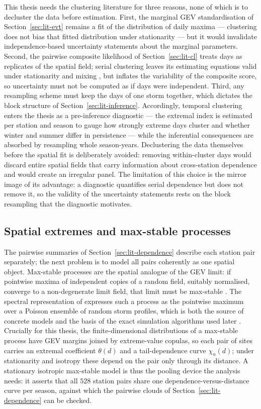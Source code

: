 This thesis needs the clustering literature for three reasons, none of which is to decluster the data before estimation. First, the marginal GEV standardisation of Section~\ref{sec:lit-evt} remains a fit of the distribution of daily maxima --- clustering does not bias that fitted distribution under stationarity --- but it would invalidate independence-based uncertainty statements about the marginal parameters. Second, the pairwise composite likelihood of Section~\ref{sec:lit-cl} treats days as replicates of the spatial field; serial clustering leaves its estimating equations valid under stationarity and mixing \citep{huserdavison2014}, but inflates the variability of the composite score, so uncertainty must not be computed as if days were independent. Third, any resampling scheme must keep the days of one storm together, which dictates the block structure of Section~\ref{sec:lit-inference}. Accordingly, temporal clustering enters the thesis as a pre-inference diagnostic --- the extremal index is estimated per station and season to gauge how strongly extreme days cluster and whether winter and summer differ in persistence --- while the inferential consequences are absorbed by resampling whole season-years. Declustering the data themselves before the spatial fit is deliberately avoided: removing within-cluster days would discard entire spatial fields that carry information about cross-station dependence and would create an irregular panel. The limitation of this choice is the mirror image of its advantage: a diagnostic quantifies serial dependence but does not remove it, so the validity of the uncertainty statements rests on the block resampling that the diagnostic motivates.

\subsection{Spatial extremes and max-stable processes}\label{sec:lit-maxstable}

The pairwise summaries of Section~\ref{sec:lit-dependence} describe each station pair separately; the next problem is to model all pairs coherently as one spatial object. Max-stable processes are the spatial analogue of the GEV limit: if pointwise maxima of independent copies of a random field, suitably normalised, converge to a non-degenerate limit field, that limit must be max-stable \citep{dehaan1984,dehaan2006}. The spectral representation of \citet{dehaan1984} expresses such a process as the pointwise maximum over a Poisson ensemble of random storm profiles, which is both the source of concrete models and the basis of the exact simulation algorithms used later \citep{dombry2016}. Crucially for this thesis, the finite-dimensional distributions of a max-stable process have GEV margins joined by extreme-value copulas, so each pair of sites carries an extremal coefficient \(\theta(d)\) and a tail-dependence curve \(\chi_u(d)\); under stationarity and isotropy these depend on the pair only through its distance. A stationary isotropic max-stable model is thus the pooling device the analysis needs: it asserts that all \(528\) station pairs share one dependence-versus-distance curve per season, against which the pairwise clouds of Section~\ref{sec:lit-dependence} can be checked.

